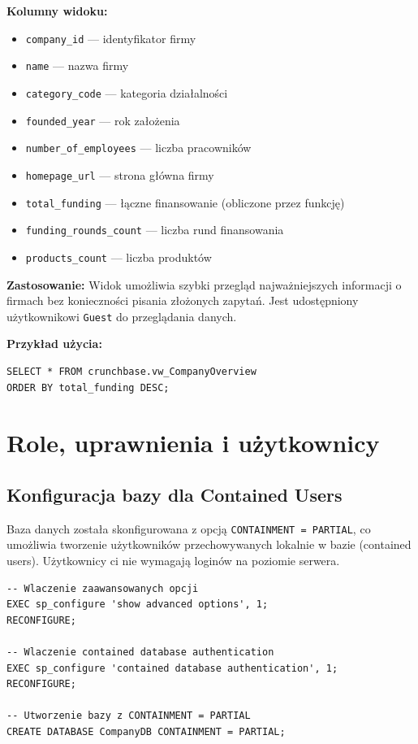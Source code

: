\documentclass[12pt,a4paper]{article}
\begin{document}
\textbf{Kolumny widoku:}
\begin{itemize}[noitemsep]
    \item \texttt{company\_id} --- identyfikator firmy
    \item \texttt{name} --- nazwa firmy
    \item \texttt{category\_code} --- kategoria działalności
    \item \texttt{founded\_year} --- rok założenia
    \item \texttt{number\_of\_employees} --- liczba pracowników
    \item \texttt{homepage\_url} --- strona główna firmy
    \item \texttt{total\_funding} --- łączne finansowanie (obliczone przez funkcję)
    \item \texttt{funding\_rounds\_count} --- liczba rund finansowania
    \item \texttt{products\_count} --- liczba produktów
\end{itemize}

\textbf{Zastosowanie:} Widok umożliwia szybki przegląd najważniejszych informacji o firmach bez konieczności pisania złożonych zapytań. Jest udostępniony użytkownikowi \texttt{Guest} do przeglądania danych.

\textbf{Przykład użycia:}
\begin{lstlisting}
SELECT * FROM crunchbase.vw_CompanyOverview
ORDER BY total_funding DESC;
\end{lstlisting}

\newpage
\section{Role, uprawnienia i użytkownicy}

\subsection{Konfiguracja bazy dla Contained Users}

Baza danych została skonfigurowana z opcją \texttt{CONTAINMENT = PARTIAL}, co umożliwia tworzenie użytkowników przechowywanych lokalnie w bazie (contained users). Użytkownicy ci nie wymagają loginów na poziomie serwera.

\begin{lstlisting}[caption={Konfiguracja Contained Database Authentication}]
-- Wlaczenie zaawansowanych opcji
EXEC sp_configure 'show advanced options', 1;
RECONFIGURE;

-- Wlaczenie contained database authentication
EXEC sp_configure 'contained database authentication', 1;
RECONFIGURE;

-- Utworzenie bazy z CONTAINMENT = PARTIAL
CREATE DATABASE CompanyDB CONTAINMENT = PARTIAL;
\end{lstlisting}
\end{document}
